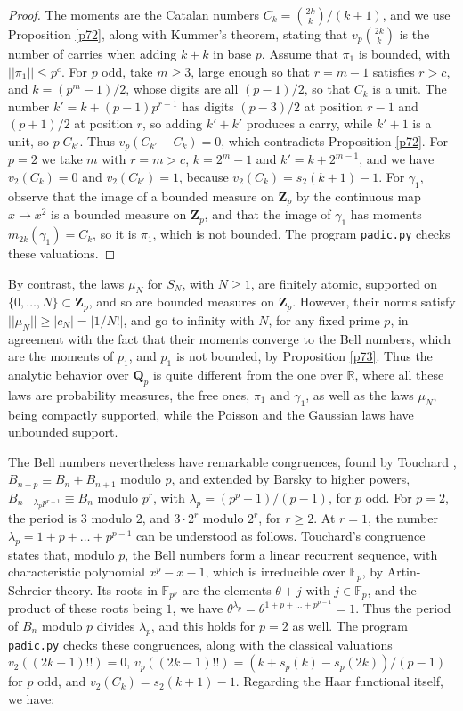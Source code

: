 \documentclass[11pt]{amsart}
\theoremstyle{definition}
\begin{document}
\begin{proof}
The moments are the Catalan numbers $C_k=\binom{2k}{k}/(k+1)$, and we use Proposition \ref{p72}, along with Kummer's theorem, stating that $v_p\binom{2k}{k}$ is the number of carries when adding $k+k$ in base $p$. Assume that $\pi_1$ is bounded, with $||\pi_1||\leq p^c$. For $p$ odd, take $m\geq3$, large enough so that $r=m-1$ satisfies $r>c$, and $k=(p^m-1)/2$, whose digits are all $(p-1)/2$, so that $C_k$ is a unit. The number $k'=k+(p-1)p^{r-1}$ has digits $(p-3)/2$ at position $r-1$ and $(p+1)/2$ at position $r$, so adding $k'+k'$ produces a carry, while $k'+1$ is a unit, so $p|C_{k'}$. Thus $v_p(C_{k'}-C_k)=0$, which contradicts Proposition \ref{p72}. For $p=2$ we take $m$ with $r=m>c$, $k=2^m-1$ and $k'=k+2^{m-1}$, and we have $v_2(C_k)=0$ and $v_2(C_{k'})=1$, because $v_2(C_k)=s_2(k+1)-1$. For $\gamma_1$, observe that the image of a bounded measure on $\mathbf Z_p$ by the continuous map $x\to x^2$ is a bounded measure on $\mathbf Z_p$, and that the image of $\gamma_1$ has moments $m_{2k}(\gamma_1)=C_k$, so it is $\pi_1$, which is not bounded. The program {\tt padic.py} checks these valuations.
\end{proof}

By contrast, the laws $\mu_N$ for $S_N$, with $N\geq1$, are finitely atomic, supported on $\{0,\ldots,N\}\subset\mathbf Z_p$, and so are bounded measures on $\mathbf Z_p$. However, their norms satisfy $||\mu_N||\geq|c_N|=|1/N!|$, and go to infinity with $N$, for any fixed prime $p$, in agreement with the fact that their moments converge to the Bell numbers, which are the moments of $p_1$, and $p_1$ is not bounded, by Proposition \ref{p73}. Thus the analytic behavior over $\mathbf Q_p$ is quite different from the one over $\mathbb R$, where all these laws are probability measures, the free ones, $\pi_1$ and $\gamma_1$, as well as the laws $\mu_N$, being compactly supported, while the Poisson and the Gaussian laws have unbounded support.

The Bell numbers nevertheless have remarkable congruences, found by Touchard \cite{tou}, $B_{n+p}\equiv B_n+B_{n+1}$ modulo $p$, and extended by Barsky \cite{bar} to higher powers, $B_{n+\lambda_pp^{r-1}}\equiv B_n$ modulo $p^r$, with $\lambda_p=(p^p-1)/(p-1)$, for $p$ odd. For $p=2$, the period is $3$ modulo $2$, and $3\cdot2^r$ modulo $2^r$, for $r\geq2$. At $r=1$, the number $\lambda_p=1+p+\ldots+p^{p-1}$ can be understood as follows. Touchard's congruence states that, modulo $p$, the Bell numbers form a linear recurrent sequence, with characteristic polynomial $x^p-x-1$, which is irreducible over $\mathbb F_p$, by Artin-Schreier theory. Its roots in $\mathbb F_{p^p}$ are the elements $\theta+j$ with $j\in\mathbb F_p$, and the product of these roots being $1$, we have $\theta^{\lambda_p}=\theta^{1+p+\ldots+p^{p-1}}=1$. Thus the period of $B_n$ modulo $p$ divides $\lambda_p$, and this holds for $p=2$ as well. The program {\tt padic.py} checks these congruences, along with the classical valuations $v_2((2k-1)!!)=0$, $v_p((2k-1)!!)=(k+s_p(k)-s_p(2k))/(p-1)$ for $p$ odd, and $v_2(C_k)=s_2(k+1)-1$. Regarding the Haar functional itself, we have:
\end{document}
